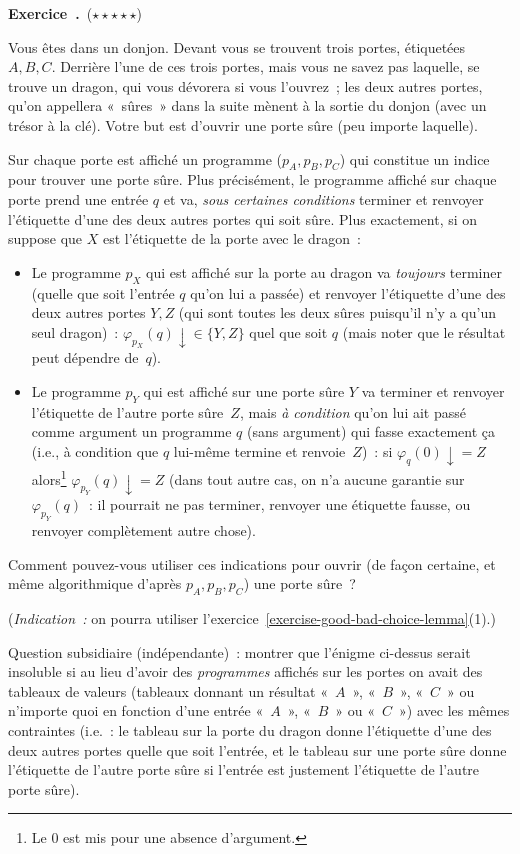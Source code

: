 \documentclass[12pt,a4paper]{article}
\theoremstyle{definition}
\newcommand\exercice{%
\refstepcounter{comcnt}\bigskip\noindent\textbf{Exercice~\thecomcnt.}}
\begin{document}
\exercice\label{exercise-dragon-riddle}\ (${\star}{\star}{\star}{\star}{\star}$)\par\nobreak

Vous êtes dans un donjon.  Devant vous se trouvent trois portes,
étiquetées $A,B,C$.  Derrière l'une de ces trois portes, mais vous ne
savez pas laquelle, se trouve un dragon, qui vous dévorera si vous
l'ouvrez ; les deux autres portes, qu'on appellera « sûres » dans la
suite mènent à la sortie du donjon (avec un trésor à la clé).  Votre
but est d'ouvrir une porte sûre (peu importe laquelle).

Sur chaque porte est affiché un programme ($p_A,p_B,p_C$) qui
constitue un indice pour trouver une porte sûre.  Plus précisément, le
programme affiché sur chaque porte prend une entrée $q$ et va,
\emph{sous certaines conditions} terminer et renvoyer l'étiquette
d'une des deux autres portes qui soit sûre.  Plus exactement, si on
suppose que $X$ est l'étiquette de la porte avec le dragon :
\begin{itemize}
\item Le programme $p_X$ qui est affiché sur la porte au dragon va
  \emph{toujours} terminer (quelle que soit l'entrée $q$ qu'on lui a
  passée) et renvoyer l'étiquette d'une des deux autres portes $Y,Z$
  (qui sont toutes les deux sûres puisqu'il n'y a qu'un seul dragon) :
  $\varphi_{p_X}(q) {\downarrow} \in \{Y,Z\}$ quel que soit $q$ (mais
  noter que le résultat peut dépendre de $q$).
\item Le programme $p_Y$ qui est affiché sur une porte sûre $Y$ va
  terminer et renvoyer l'étiquette de l'autre porte sûre $Z$, mais
  \emph{à condition} qu'on lui ait passé comme argument un programme
  $q$ (sans argument) qui fasse exactement ça (i.e., à condition que
  $q$ lui-même termine et renvoie $Z$) : si
  $\varphi_{q}(0){\downarrow} = Z$ alors\footnote{Le $0$ est mis pour
  une absence d'argument.}  $\varphi_{p_Y}(q) {\downarrow} = Z$ (dans
  tout autre cas, on n'a aucune garantie sur $\varphi_{p_Y}(q)$ : il
  pourrait ne pas terminer, renvoyer une étiquette fausse, ou renvoyer
  complètement autre chose).
\end{itemize}

Comment pouvez-vous utiliser ces indications pour ouvrir (de façon
certaine, et même algorithmique d'après $p_A,p_B,p_C$) une porte
sûre ?

(\emph{Indication :} on pourra utiliser
l'exercice \ref{exercise-good-bad-choice-lemma}(1).)

Question subsidiaire (indépendante) : montrer que l'énigme ci-dessus
serait insoluble si au lieu d'avoir des \emph{programmes} affichés sur
les portes on avait des tableaux de valeurs (tableaux donnant un
résultat « $A$ », « $B$ », « $C$ » ou n'importe quoi en fonction d'une
entrée « $A$ », « $B$ » ou « $C$ ») avec les mêmes contraintes (i.e. :
le tableau sur la porte du dragon donne l'étiquette d'une des deux
autres portes quelle que soit l'entrée, et le tableau sur une porte
sûre donne l'étiquette de l'autre porte sûre si l'entrée est justement
l'étiquette de l'autre porte sûre).
\end{document}

